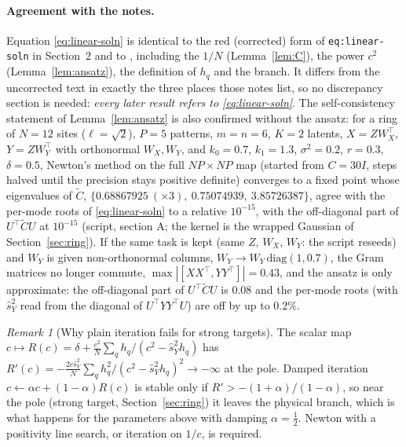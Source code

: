 \documentclass[11pt,a4paper]{article}
\newcommand{\sY}{\hat s_Y^2}
\theoremstyle{remark}
\newtheorem{remark}{Remark}
\begin{document}
\paragraph{Agreement with the notes.}
Equation \eqref{eq:linear-soln} is identical to the red (corrected) form of \texttt{eq:linear-soln} in Section~2 and to , including the $1/N$ (Lemma~\ref{lem:C}), the power $c^2$ (Lemma~\ref{lem:ansatz}), the definition of $h_q$ and the branch. It differs from the uncorrected text in exactly the three places those notes list, so no discrepancy section is needed: \emph{every later result refers to \eqref{eq:linear-soln}}.
The self-consistency statement of Lemma~\ref{lem:ansatz} is also confirmed without the ansatz: for a ring of $N = 12$ sites ($\ell = \sqrt2$), $P = 5$ patterns, $m = n = 6$, $K = 2$ latents, $X = ZW_X^\top$, $Y = ZW_Y^\top$ with orthonormal $W_X, W_Y$, and $k_0 = 0.7$, $k_1 = 1.3$, $\sigma^2 = 0.2$, $r = 0.3$, $\delta = 0.5$, Newton's method on the full $NP\times NP$ map (started from $C = 30I$, steps halved until the precision stays positive definite) converges to a fixed point whose eigenvalues of $\tilde C$, $\{0.68867925\ (\times3),\ 0.75074939,\ 3.85726387\}$, agree with the per-mode roots of \eqref{eq:linear-soln} to a relative $10^{-15}$, with the off-diagonal part of $U^\top\tilde CU$ at $10^{-15}$ (script, section A; the kernel is the wrapped Gaussian of Section~\ref{sec:ring}).
If the same task is kept (same $Z$, $W_X$, $W_Y$: the script reseeds) and $W_Y$ is given non-orthonormal columns, $W_Y \to W_Y\,\mathrm{diag}(1, 0.7)$, the Gram matrices no longer commute, $\max|[XX^\top,YY^\top]| = 0.43$, and the ansatz is only approximate: the off-diagonal part of $U^\top\tilde CU$ is $0.08$ and the per-mode roots (with $\sY$ read from the diagonal of $U^\top YY^\top U$) are off by up to $0.2\%$.

\begin{remark}[Why plain iteration fails for strong targets]
The scalar map $c\mapsto R(c) = \delta + \frac{c^2}{N}\sum_q h_q/(c^2-\sY h_q)$ has $R'(c) = -\frac{2c\sY}{N}\sum_q h_q^2/(c^2-\sY h_q)^2 \to -\infty$ at the pole. Damped iteration $c \leftarrow \alpha c + (1-\alpha)R(c)$ is stable only if $R' > -(1+\alpha)/(1-\alpha)$, so near the pole (strong target, Section~\ref{sec:ring}) it leaves the physical branch, which is what happens for the parameters above with damping $\alpha = \tfrac12$. Newton with a positivity line search, or iteration on $1/c$, is required.
\end{remark}
\end{document}
